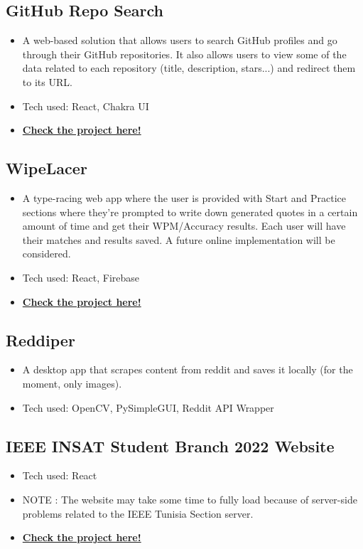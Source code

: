 \documentclass[a4,10pt]{article}
\newenvironment{zitemize}{
\begin{itemize}\itemsep0pt \parskip0pt \parsep1pt}
{\end{itemize}\vspace{-0.5cm}}
\begin{document}
\subsection*{GitHub Repo Search {\normalsize\normalfont} \hfill} 
    \begin{zitemize}
        \item A web-based solution that allows users to search GitHub profiles and go through their GitHub repositories. It also allows users to view some of the data related to each repository (title, description, stars...) and redirect them to its URL.
        \item Tech used: React, Chakra UI
         \item \href{https://mvst-project.netlify.app/}{\small \textbf {Check the project here!}}
    \end{zitemize}

\subsection*{WipeLacer {\normalsize\normalfont} \hfill} 
    \begin{zitemize}
        \item A type-racing web app where the user is provided with Start and Practice sections where they're prompted to write down generated quotes in a certain amount of time and get their WPM/Accuracy results. Each user will have their matches and results saved. A future online implementation will be considered.
        \item Tech used: React, Firebase
         \item \href{https://wipelacer.vercel.app}{\small \textbf {Check the project here!}}
    \end{zitemize}


\subsection*{Reddiper {\normalsize\normalfont} \hfill} 
    \begin{zitemize}
        \item A desktop app that scrapes content from reddit and saves it locally (for the moment, only images).
        \item  Tech used: OpenCV, PySimpleGUI, Reddit API Wrapper
    \end{zitemize}
\subsection*{IEEE INSAT Student Branch 2022 Website {\normalsize\normalfont} \hfill} 
    \begin{zitemize}
        \item Tech used: React
         \item NOTE : The website may take some time to fully load because of server-side problems related to the IEEE Tunisia Section server.
        \item \href{https://insat.ieee.tn}{\small \textbf {Check the project here!}}
       
    \end{zitemize}
\end{document}
